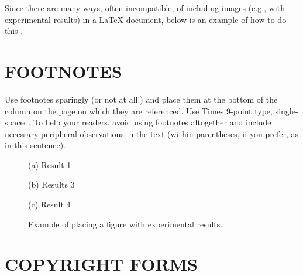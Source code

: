 \documentclass[letterpaper, 10 pt, twoside, conference]{ieeeconf}
\begin{document}
Since there are many ways, often incompatible, of including images (e.g., with
experimental results) in a LaTeX document, below is an example of how to do
this \cite{Chai1999}.

\section{FOOTNOTES}
\label{sec:foot}

Use footnotes sparingly (or not at all!) and place them at the bottom of the
column on the page on which they are referenced. Use Times 9-point type,
single-spaced. To help your readers, avoid using footnotes altogether and
include necessary peripheral observations in the text (within parentheses, if
you prefer, as in this sentence).

\begin{figure}[htb]

\begin{minipage}[b]{1.0\linewidth}
  \centering
  \centerline{(a) Result 1}\medskip
\end{minipage}
%
\begin{minipage}[b]{.48\linewidth}
  \centering
  \centerline{(b) Results 3}\medskip
\end{minipage}
\hfill
\begin{minipage}[b]{0.48\linewidth}
  \centering
  \centerline{(c) Result 4}\medskip
\end{minipage}
%
\caption{Example of placing a figure with experimental results.}
\label{fig:res}
%
\end{figure}



\section{COPYRIGHT FORMS}
\label{sec:copyright}
\end{document}
